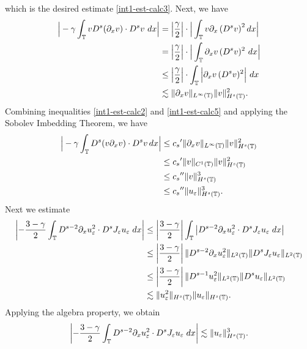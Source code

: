 %
which  is the desired estimate  \eqref{int1-est-calc3}.
Next, we have
%
%
%
\begin{equation} 
\label{int1-est-calc5}
\begin{split}
\Big|
-\gamma \int_{\mathbb{T}}
v D^s (\partial_x v)
\cdot  D^s v \ dx
\Big|
& =
\left | \frac{\gamma}{2} \right | \cdot \Big|
\int_{\mathbb{T}}
v \partial_x\left(D^s v\right)^2  dx
\Big|
\\
& =
\left | \frac{\gamma}{2} \right | \cdot \Big | \int_{\mathbb{T}}
\partial_x v \, (D^s v)^2 \ dx
\Big|
\\
& \le
\left | \frac{\gamma}{2} \right |  \cdot \int_{\mathbb{T}}
\Big | \partial_x v \, (D^s v)^2   
\Big| \ dx
\\
& \lesssim
\| \partial_x v \|_{L^\infty(\mathbb{T})} 
\| v \|_{H^s(\mathbb{T})}^2.
\end{split}
\end{equation}
%
%
%
Combining inequalities  \eqref{int1-est-calc2} and
\eqref{int1-est-calc5} and applying the Sobolev Imbedding Theorem, we
have
%
\begin{equation} 
\label{burgers_est'}
\begin{split}
\Big|
-\gamma \int_{\mathbb{T}}
D^s(v \partial_x v) \cdot   D^s v \, dx  
\Big|
&\le
{c_s}^\prime
\| \partial_x v \|_{L^\infty(\mathbb{T})} 
\|  v \|_{H^s(\mathbb{T})}^2
\\
& \le {c_s}^\prime \| v \|_{C^1(\mathbb{T})} \| v \|_{H^s(\mathbb{T})}^2
\\
& \le {c_s}^{\prime \prime} \| v \|_{H^s(\mathbb{T})}^3
\\
& \le {c_s}^{\prime \prime} \| u_\varepsilon \|_{H^s(\mathbb{T})}^3.
\end{split}
\end{equation}
%
Next we estimate
\begin{equation}
\begin{split}
\left | - \frac{3 -\gamma}{2} \int_{\mathbb{T}} D^{s-2} \partial_x u_\varepsilon^2 \cdot
D^s J_\varepsilon u_\varepsilon \; dx \right |
& \le \left | \frac{3- \gamma}{2} \right | \int_{\mathbb{T}} \left |
D^{s-2} \partial_x u_\varepsilon^2 \cdot D^s J_\varepsilon u_\varepsilon \; dx \right | 
\\
& \le \left | \frac{3- \gamma}{2} \right |
\|D^{s-2} \partial_x u_\varepsilon^2 \|_{L^2(\mathbb{T})} 
\|D^s J_\varepsilon u_\varepsilon \|_{L^2(\mathbb{T})}
\\
& \le \left | \frac{3- \gamma}{2} \right |
\|D^{s-1} u_\varepsilon^2 \|_{L^2(\mathbb{T})} 
\|D^s u_\varepsilon \|_{L^2(\mathbb{T})}
\\
& \lesssim \| u_\varepsilon^2 \|_{H^s(\mathbb{T})} \| u_\varepsilon \|_{H^s(\mathbb{T})}.
\end{split}
\end{equation}
%
%
Applying the algebra property, we obtain
%
\begin{equation}
\label{hl1}
\begin{split}
\left | - \frac{3 -\gamma}{2} \int_{\mathbb{T}} D^{s-2} \partial_x u_\varepsilon^2 \cdot
D^s J_\varepsilon u_\varepsilon \; dx \right |
\lesssim \| u_\varepsilon \|_{H^s(\mathbb{T})}^3.
\end{split}
\end{equation}
